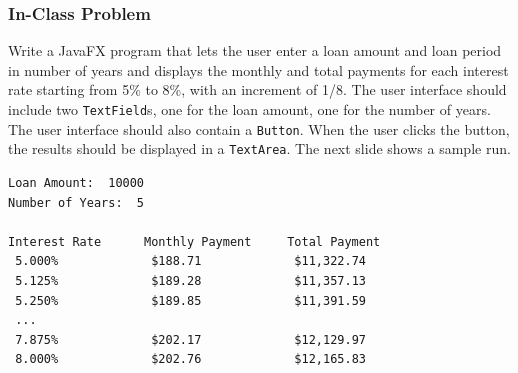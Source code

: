 \documentclass{beamer}
\newcommand{\mil}[1]{\texttt{#1}}
\begin{document}
\begin{frame}

    \frametitle{In-Class Problem}
    
 Write a JavaFX program that lets the user enter a loan amount and loan period in number of years and displays the monthly and total payments for each interest rate starting from 5\% to 8\%, with an increment of 1/8.  The user interface should include two \mil{TextField}s, one for the loan amount, one for the number of years.  The user interface should also contain a \mil{Button}.  When the user clicks the button, the results should be displayed in a \mil{TextArea}.  The next slide shows a sample run.
\end{frame}

\begin{frame}[fragile]
\begin{verbatim}
Loan Amount:  10000
Number of Years:  5

Interest Rate      Monthly Payment     Total Payment
 5.000%             $188.71             $11,322.74
 5.125%             $189.28             $11,357.13
 5.250%             $189.85             $11,391.59
 ...
 7.875%             $202.17             $12,129.97
 8.000%             $202.76             $12,165.83 
\end{verbatim}
\end{frame}
\end{document}
